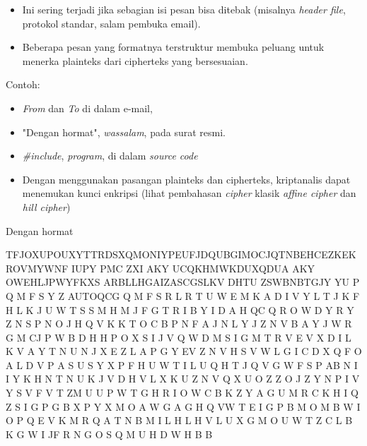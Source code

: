 \documentclass{article}
\begin{document}

\begin{itemize}
    \item Ini sering terjadi jika sebagian isi pesan bisa ditebak (misalnya \textit{header file}, protokol standar, salam pembuka email).
    \item Beberapa pesan yang formatnya terstruktur membuka peluang untuk menerka plainteks dari cipherteks yang bersesuaian.
\end{itemize}

Contoh:

\begin{itemize}
    \item \textit{From} dan \textit{To} di dalam e-mail,
    \item "Dengan hormat", \textit{wassalam}, pada surat resmi.
    \item \textit{\#include}, \textit{program}, di dalam \textit{source code}
\end{itemize}

\vspace{10mm}

\begin{itemize}
    \item Dengan menggunakan pasangan plainteks dan cipherteks, kriptanalis dapat menemukan kunci enkripsi (lihat pembahasan \textit{cipher} klasik \textit{affine cipher} dan \textit{hill cipher})
\end{itemize}

\newpage


Dengan hormat

\vspace{32.67mm}

TFJOXUPOUXYTTRDSXQMONIYPEUFJDQUBGIMOCJQTNBEHCEZKEKROV\nBNTWLMVXMOWZLUCHOXYGSKBGQUAOBQZKXIYJIETSWVXVHKCUAOT\nOFYIZAKJGXKAWGQTRVFDZAJNQDUlWZC MYWNF IUPY PMC ZXI AKY UCQ\nIAZPIQMGAMGUAKK KHMWKDUXQDUA AKY OWEHLJPWYFKXS ARBLLHGA\nJKTQNTRTPWCS IZASCGSLKV DHTU ZSWBNBTGJY YU P Q M F S Y Z AUTOQC\nDN G Q M F S R L R T U W E M K A D I V Y L T J K F H L K J U W T S S M H M J F G T R I B Y I D A H Q\nEPMPI C Q R O W D Y R Y Z N S P N O J H Q V K K T O C B P N F A J N L Y J Z N V B A Y J W R G M C\nH J P W B D H H P O X S I J V Q W D M S I G M T R V E V X D I L K V A Y T N U N J X E Z L A P G Y E\nTR V Z N V H S V W L G I C D X Q F O A L D V P A S U S Y X P F H U W T I L U Q H T J Q V G W F S P A\nEKBR B N I I Y K H N T N U K J V D H V L X K U Z N V Q X U O Z Z O J Z Y N P I V Y S V F V T Z\nM M U U P W T G H R I O W C B K Z Y A G U M R C K H I Q Z S I G P G B X P Y X M O A W G A G H Q V\nU W T E I G P B M O M B W I O P Q E V K M R Q A T N B M I L H L H V L U X G M O U W T Z C L B K G W I J\nH F R N G O S Q M U H D W H B B
\end{document}
